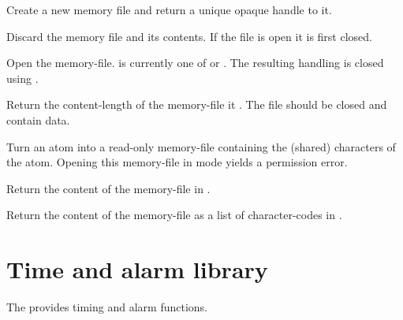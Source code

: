 \documentclass[11pt]{article}
\begin{document}
\begin{description}
Create a new memory file and return a unique opaque handle to it.

Discard the memory file and its contents.  If the file is open it
is first closed.

Open the memory-file.   is currently one of 
or .  The resulting handling is closed
using .

Return the content-length of the memory-file it .  The
file should be closed and contain data.

Turn an atom into a read-only memory-file containing the (shared)
characters of the atom.  Opening this memory-file in mode 
yields a permission error.

Return the content of the memory-file in .

Return the content of the memory-file as a list of character-codes
in .
\end{description}


\section{Time and alarm library}

The  provides timing and alarm functions.  
\end{document}
